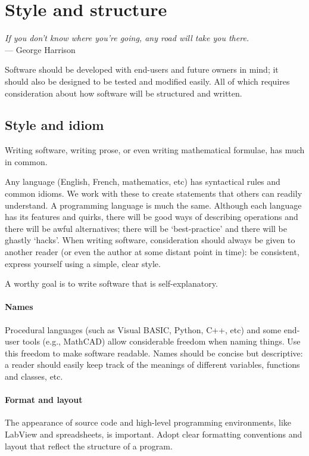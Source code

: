 \section{Style and structure}

\begin{flushright}
\textit{If you don’t know where you’re going, any road will take you there.}\\
--- George Harrison
\end{flushright}

Software should be developed with end-users and future owners in mind; it should also be designed to be tested and modified easily. All of which requires consideration about how software will be structured and written.

\subsection{Style and idiom}
Writing software, writing prose, or even writing mathematical formulae, has much in common.

Any language (English, French, mathematics, etc) has syntactical rules and common idioms. We work with these to create statements that others can readily understand. A programming language is much the same. Although each language has its features and quirks, there will be good ways of describing operations and there will be awful alternatives; there will be `best-practice' and there will be ghastly `hacks'. When writing software, consideration should always be given to another reader (or even the author at some distant point in time): be consistent, express yourself using a simple, clear style.

A worthy goal is to write software that is self-explanatory. 

\paragraph{Names} 
Procedural languages (such as Visual BASIC, Python, C++, etc) and some end-user tools (e.g., MathCAD) allow considerable freedom when naming things. Use this freedom to make software readable. Names should be concise but descriptive: a reader should easily keep track of the meanings of different variables, functions and classes, etc.

\paragraph{Format and layout} The appearance of source code and high-level programming environments, like LabView and spreadsheets, is important. Adopt clear formatting conventions and layout that reflect the structure of a program. 

